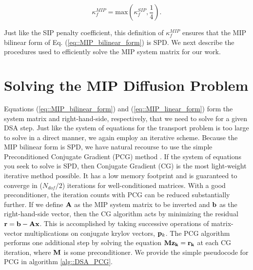 \begin{equation}
\label{eq::MIP_penalty_term}
\kappa_f^{MIP} = \text{max} \left( \kappa_f^{SIP}, \frac{1}{4} \right).
\end{equation}

\noindent Just like the SIP penalty coefficient, this definition of $\kappa_f^{MIP}$ ensures that the MIP bilinear form of Eq. (\ref{eq::MIP_bilinear_form}) is SPD. We next describe the procedures used to efficiently solve the MIP system matrix for our work.

\section{Solving the MIP Diffusion Problem}
\label{sec::DSA_Solving}

Equations (\ref{eq::MIP_bilinear_form}) and (\ref{eq::MIP_linear_form}) form the system matrix and right-hand-side, respectively, that we need to solve for a given DSA step. Just like the system of equations for the transport problem is too large to solve in a direct manner, we again employ an iterative scheme. Because the MIP bilinear form is SPD, we have natural recourse to use the simple Preconditioned Conjugate Gradient (PCG) method \cite{saad2003iterative}. If the system of equations you seek to solve is SPD, then Conjugate Gradient (CG) is the most light-weight iterative method possible. It has a low memory footprint and is guaranteed to converge in ($N_{dof}/2$) iterations for well-conditioned matrices. With a good preconditioner, the iteration counts with PCG can be reduced substantially further. If we define ${\bf A}$ as the MIP system matrix to be inverted and ${\bf b}$ as the right-hand-side vector, then the CG algorithm acts by minimizing the residual ${\bf r} = {\bf b} - {\bf A} {\bf x}$. This is accomplished by taking successive operations of matrix-vector multiplications on conjugate krylov vectors, ${\bf p}_k$. The PCG algorithm performs one additional step by solving the equation ${\bf M} {\bf z_k} = {\bf r_k}$ at each CG iteration, where ${\bf M}$ is some preconditioner. We provide the simple pseudocode for PCG in algorithm \ref{alg::DSA_PCG}.

